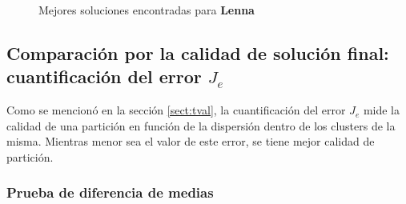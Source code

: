 \begin{figure}[h!]
   \qquad
   \qquad
  \caption{Mejores soluciones encontradas para \textbf{Lenna}}
  \label{fig:lennaresults}
\end{figure}

\subsection{Comparación por la calidad de solución final: cuantificación del error $J_e$}

    Como se mencionó en la sección \ref{sect:tval}, la cuantificación del error
$J_e$ mide la calidad de una partición en función de la dispersión dentro de los
clusters de la misma. Mientras menor sea el valor de este error, se tiene mejor
calidad de partición.

\subsubsection{Prueba de diferencia de medias}\label{analisis:je_mean_hip}

